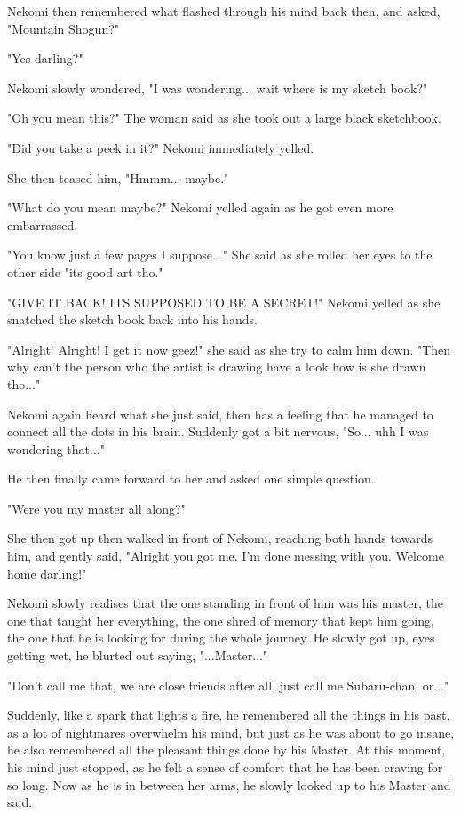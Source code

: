 Nekomi then remembered what flashed through his mind back then, and asked, "Mountain Shogun?" 

"Yes darling?"

Nekomi slowly wondered, "I was wondering... wait where is my sketch book?"

"Oh you mean this?" The woman said as she took out a large black sketchbook. 

"Did you take a peek in it?" Nekomi immediately yelled.

She then teased him, "Hmmm... maybe."

"What do you mean maybe?" Nekomi yelled again as he got even more embarrassed. 

"You know just a few pages I suppose..." She said as she rolled her eyes to the other side "its good art tho."

"GIVE IT BACK! ITS SUPPOSED TO BE A SECRET!" Nekomi yelled as she snatched the sketch book back into his hands. 

"Alright! Alright! I get it now geez!" she said as she try to calm him down. "Then why can't the person who the artist is drawing have a look how is she drawn tho..."

Nekomi again heard what she just said, then has a feeling that he managed to connect all the dots in his brain. 
Suddenly got a bit nervous, "So... uhh I was wondering that..."

He then finally came forward to her and asked one simple question.

"Were you my master all along?"

She then got up then walked in front of Nekomi, reaching both hands towards him, and gently said, "Alright you got me. I'm done messing with you. Welcome home darling!"

Nekomi slowly realises that the one standing in front of him was his master, the one that taught her everything, the one shred of memory that kept him going, the one that he is looking for during the whole journey. He slowly got up, eyes getting wet, he blurted out saying, "...Master..."

"Don't call me that, we are close friends after all, just call me Subaru-chan, or..."

Suddenly, like a spark that lights a fire, he remembered all the things in his past, as a lot of nightmares overwhelm his mind, but just as he was about to go insane, he also remembered all the pleasant things done by his Master. 
At this moment, his mind just stopped, as he felt a sense of comfort that he has been craving for so long.
Now as he is in between her arms, he slowly looked up to his Master and said.

